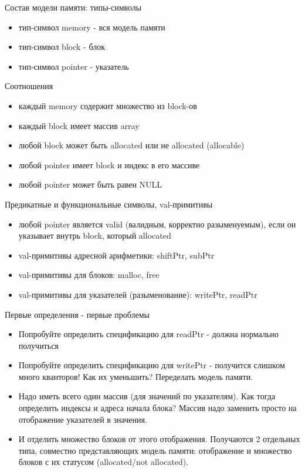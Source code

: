 \documentclass[hyperref={unicode=true}]{beamer}
\begin{document}
    \begin{frame}{Состав модели памяти: типы-символы}
    \begin{itemize}
    \item
    тип-символ memory - вся модель памяти
    \item
    тип-символ block - блок
    \item
    тип-символ pointer - указатель
    \end{itemize}
    \end{frame}

    \begin{frame}{Соотношения}
    \begin{itemize}
    \item
    каждый memory содержит множество из block-ов
    \item
    каждый block имеет массив array
    \item
    любой block может быть allocated или не allocated (allocable)
    \item
    любой pointer имеет block и индекс в его массиве
    \item
    любой pointer может быть равен NULL
\iffalse
    \item
    любые два pointer из разных block-ов не сравнимы
\fi
    \end{itemize}
    \end{frame}

    \begin{frame}{Предикатные и функциональные символы, val-примитивы}
    \begin{itemize}
    \item
    любой pointer является valid (валидным, корректно разыменуемым), если
    он указывает внутрь block, который allocated
    \item
    val-примитивы адресной арифметики: shiftPtr, subPtr
    \item
    val-примитивы для блоков: malloc, free
    \item
    val-примитивы для указателей (разыменование): writePtr, readPtr
    \end{itemize}
    \end{frame}

    \begin{frame}{Первые определения - первые проблемы}
    \begin{itemize}
    \item
    Попробуйте определить спецификацию для readPtr - должна нормально получиться
    \item
    Попробуйте определить спецификацию для writePtr - получится слишком
    много кванторов! Как их уменьшить? Переделать модель памяти.
    \item
    Надо иметь всего один массив (для значений по указателям).
    Как тогда определить индексы и адреса начала блока? Массив надо заменить
    просто на отображение указателей в значения.
    \item
    И отделить множество блоков от этого отображения. Получаются 2 отдельных
    типа, совместно представляющих модель памяти: отображение и множество блоков
    с их статусом (allocated/not allocated).
    \end{itemize}
    \end{frame}
\end{document}
